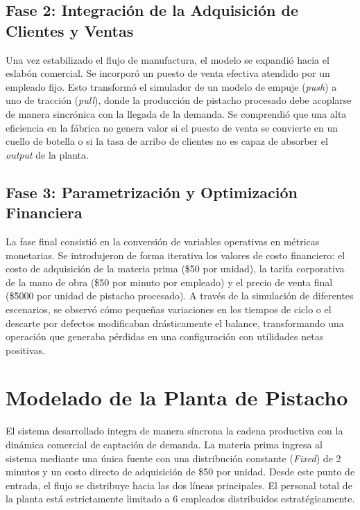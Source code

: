 \documentclass{llncs}
\begin{document}
\subsection{Fase 2: Integración de la Adquisición de Clientes y Ventas}
Una vez estabilizado el flujo de manufactura, el modelo se expandió hacia el eslabón comercial. Se incorporó un puesto de venta efectiva atendido por un empleado fijo. Esto transformó el simulador de un modelo de empuje (\textit{push}) a uno de tracción (\textit{pull}), donde la producción de pistacho procesado debe acoplarse de manera sincrónica con la llegada de la demanda. Se comprendió que una alta eficiencia en la fábrica no genera valor si el puesto de venta se convierte en un cuello de botella o si la tasa de arribo de clientes no es capaz de absorber el \textit{output} de la planta.

\subsection{Fase 3: Parametrización y Optimización Financiera}
La fase final consistió en la conversión de variables operativas en métricas monetarias. Se introdujeron de forma iterativa los valores de costo financiero: el costo de adquisición de la materia prima (\$50 por unidad), la tarifa corporativa de la mano de obra (\$50 por minuto por empleado) y el precio de venta final (\$5000 por unidad de pistacho procesado). A través de la simulación de diferentes escenarios, se observó cómo pequeñas variaciones en los tiempos de ciclo o el descarte por defectos modificaban drásticamente el balance, transformando una operación que generaba pérdidas en una configuración con utilidades netas positivas.

\section{Modelado de la Planta de Pistacho}
El sistema desarrollado integra de manera síncrona la cadena productiva con la dinámica comercial de captación de demanda. La materia prima ingresa al sistema mediante una única fuente con una distribución constante (\textit{Fixed}) de 2 minutos y un costo directo de adquisición de \$50 por unidad. Desde este punto de entrada, el flujo se distribuye hacia las dos líneas principales. El personal total de la planta está estrictamente limitado a 6 empleados distribuidos estratégicamente.
\end{document}
